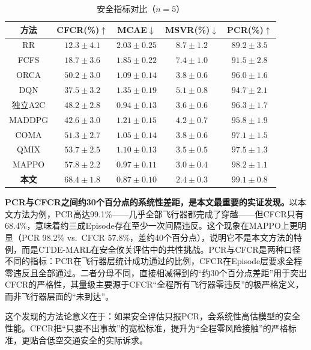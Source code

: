 \documentclass[12pt,a4paper,UTF8]{ctexart}
\begin{document}
\begin{table}[H]
    \centering
    \caption{安全指标对比（$n=5$）}
    \label{tab:safety}
    \begin{tabular}{|c|c|c|c|c|}
        \hline
        \textbf{方法} & \textbf{CFCR(\%)$\uparrow$} & \textbf{MCAE$\downarrow$} & \textbf{MSVR(\%)$\downarrow$} & \textbf{PCR(\%)$\uparrow$} \\
        \hline
        RR & $12.3\pm4.1$ & $2.03\pm0.25$ & $8.7\pm1.2$ & $89.2\pm3.5$ \\
        FCFS & $18.7\pm3.6$ & $1.85\pm0.22$ & $7.4\pm1.0$ & $91.5\pm2.8$ \\
        ORCA & $50.2\pm3.0$ & $1.09\pm0.14$ & $3.8\pm0.6$ & $96.0\pm1.6$ \\
        DQN & $37.5\pm3.2$ & $1.35\pm0.19$ & $5.1\pm0.8$ & $94.7\pm2.1$ \\
        独立A2C & $48.2\pm2.8$ & $0.94\pm0.13$ & $3.6\pm0.6$ & $96.3\pm1.7$ \\
        MADDPG & $42.6\pm3.0$ & $1.21\pm0.15$ & $4.2\pm0.7$ & $95.8\pm1.9$ \\
        COMA & $51.3\pm2.7$ & $1.05\pm0.14$ & $3.8\pm0.6$ & $97.1\pm1.5$ \\
        QMIX & $53.7\pm2.5$ & $1.10\pm0.13$ & $3.5\pm0.5$ & $97.5\pm1.3$ \\
        MAPPO & $57.8\pm2.2$ & $0.97\pm0.11$ & $3.0\pm0.4$ & $98.2\pm1.1$ \\
        \textbf{本文} & $\mathbf{68.4\pm1.8}$ & $\mathbf{0.87\pm0.10}$ & $\mathbf{2.4\pm0.3}$ & $\mathbf{99.1\pm0.8}$ \\
        \hline
    \end{tabular}
\end{table}

\textbf{PCR与CFCR之间约30个百分点的系统性差距，是本文最重要的实证发现。}以本文方法为例，PCR高达99.1\%——几乎全部飞行器都完成了穿越——但CFCR只有68.4\%，意味着约三成Episode存在至少一次间隔违反。这个现象在MAPPO上更明显（PCR 98.2\% vs.\ CFCR 57.8\%，差约40个百分点），说明它不是本文方法的特例，而是CTDE-MARL在安全攸关评估中的共性挑战。PCR与CFCR是两种口径不同的指标：PCR在飞行器层统计成功通过的比例，CFCR在Episode层要求全程零违反且全部通过。二者分母不同，直接相减得到的“约30个百分点差距”用于突出CFCR的严格性，其量级主要源于CFCR“全程所有飞行器零违反”的极严格定义，而非飞行器层面的“未到达”。

这个发现的方法论意义在于：如果安全评估只报PCR，会系统性高估模型的安全性能。CFCR把“只要不出事故”的宽松标准，提升为“全程零风险接触”的严格标准，更贴合低空交通安全的实际诉求。
\end{document}
